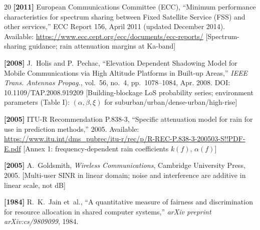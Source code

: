 \begin{thebibliography}{20}
\textbf{[2011]} European Communications Committee (ECC), ``Minimum performance characteristics
for spectrum sharing between Fixed Satellite Service (FSS) and other services,''
ECC Report 156, April 2011 (updated December 2014).
Available: \url{https://www.ecc.cept.org/ecc/documents/ecc-reports/}
[Spectrum-sharing guidance; rain attenuation margins at Ka-band]

\textbf{[2008]} J.~Holis and P.~Pechac, ``Elevation Dependent Shadowing Model for Mobile
Communications via High Altitude Platforms in Built-up Areas,'' \emph{IEEE
Trans. Antennas Propag.}, vol.~56, no.~4, pp.~1078--1084, Apr. 2008.
DOI: 10.1109/TAP.2008.919209
[Building-blockage LoS probability series; environment parameters (Table I): $(\alpha, \beta, \xi)$ for suburban/urban/dense-urban/high-rise]

\textbf{[2005]} ITU-R Recommendation P.838-3, ``Specific attenuation model for rain for use in
prediction methods,'' 2005.
Available: \url{https://www.itu.int/dms_pubrec/itu-r/rec/p/R-REC-P.838-3-200503-S!!PDF-E.pdf}
[Annex 1: frequency-dependent rain coefficients $k(f)$, $\alpha(f)$]

\textbf{[2005]} A.~Goldsmith, \emph{Wireless Communications}, Cambridge University Press, 2005.
[Multi-user SINR in linear domain; noise and interference are additive in linear scale, not dB]

\textbf{[1984]} R.~K.~Jain et~al., ``A quantitative measure of fairness and discrimination for resource allocation in shared computer systems,''
\textit{arXiv preprint arXiv:cs/9809099}, 1984.

\end{thebibliography}
